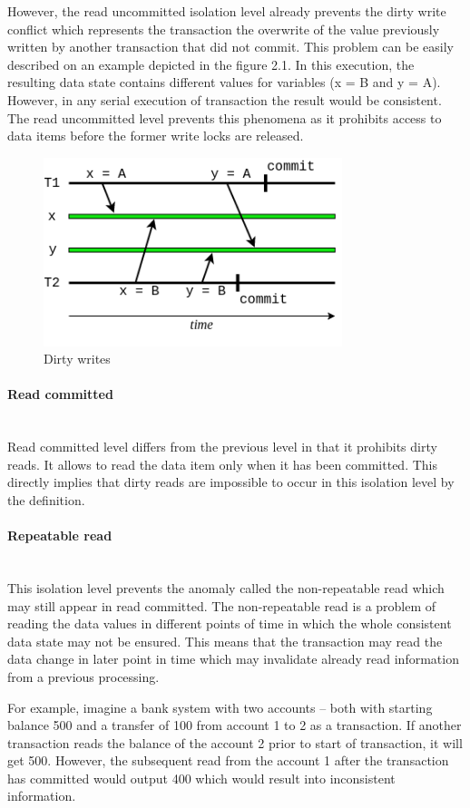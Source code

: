 \documentclass[oneside,
  digital, %
  table,   %
  nolof,     %
  nolot,     %
]{fithesis3}
\newcommand{\newlinepar}[1]{\paragraph{#1}\needspace{4\baselineskip}\mbox{}\\}
\begin{document}
However, the read uncommitted isolation level already prevents the dirty write conflict which represents the transaction the overwrite of the value previously written by another transaction that did not commit. This problem can be easily described on an example depicted in the figure 2.1. In this execution, the resulting data state contains different values for variables (x = B and y = A). However, in any serial execution of transaction the result would be consistent. The read uncommitted level prevents this phenomena as it prohibits access to data items before the former write locks are released.

\begin{figure}
    \begin{center}
        \includegraphics[height=55mm]{images/dirtyWrite.png}
    \end{center}
    \caption{Dirty writes}
\end{figure}


\newlinepar{Read committed}

Read committed level differs from the previous level in that it prohibits dirty reads. It allows to read the data item only when it has been committed. This directly implies that dirty reads are impossible to occur in this isolation level by the definition.


\newlinepar{Repeatable read}

This isolation level prevents the anomaly called the non-repeatable read which may still appear in read committed. The non-repeatable read is a problem of reading the data values in different points of time in which the whole consistent data state may not be ensured. This means that the transaction may read the data change in later point in time which may invalidate already read information from a previous processing.

For example, imagine a bank system with two accounts -- both with starting balance 500 and a transfer of 100 from account 1 to 2 as a transaction. If another transaction reads the balance of the account 2 prior to start of transaction, it will get 500. However, the subsequent read from the account 1 after the transaction has committed would output 400 which would result into inconsistent information.
\end{document}
